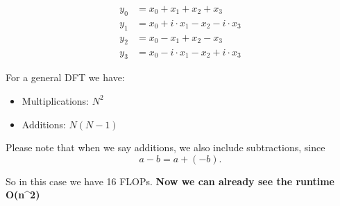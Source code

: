 \documentclass{article}
\begin{document}
\begin{align}
y_0 &= x_0 + x_1 + x_2 + x_3 \\
y_1 &= x_0 + i \cdot x_1 - x_2 - i \cdot x_3 \\
y_2 &= x_0 - x_1 + x_2 - x_3 \\
y_3 &= x_0 - i \cdot x_1 - x_2 + i \cdot x_3
\end{align}

For a general DFT we have:
\begin{itemize}
    \item Multiplications: $N^2$
    \item Additions: $N(N-1)$
\end{itemize}

Please note that when we say additions, we also include subtractions, since
\[
a - b = a + (-b).
\]

So in this case we have 16 FLOPs.
\textbf{Now we can already see the runtime O(n^{2})}
\end{document}
